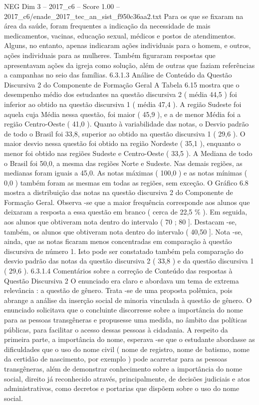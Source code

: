 \begin{textsample}{NEG Dim 3 – 2017\_c6 – Score 1.00 – 2017\_c6/enade\_2017\_tec\_an\_sist\_f950c36aa2.txt}
Para os que se fixaram na área da saúde, foram frequentes a indicação da necessidade de mais medicamentos, vacinas, educação sexual, médicos e postos de atendimentos.
Alguns, no entanto, apenas indicaram ações individuais para o homem, e outros, ações individuais para as mulheres.
Também figuraram respostas que apresentavam ações da igreja como solução, além de outras que faziam referências a campanhas no seio das famílias. 6.3.1.3 Análise de Conteúdo da Questão Discursiva 2 do Componente de Formação Geral A Tabela 6.15 mostra que o desempenho médio dos estudantes na questão discursiva 2 ( média 44,5 ) foi inferior ao obtido na questão discursiva 1 ( média 47,4 ).
A região Sudeste foi aquela cuja Média nessa questão, foi maior ( 45,9 ), e a de menor Média foi a região Centro-Oeste ( 41,0 ).
Quanto à variabilidade das notas, o Desvio padrão de todo o Brasil foi 33,8, superior ao obtido na questão discursiva 1 ( 29,6 ).
O maior desvio nessa questão foi obtido na região Nordeste ( 35,1 ), enquanto o menor foi obtido nas regiões Sudeste e Centro-Oeste ( 33,5 ).
A Mediana de todo o Brasil foi 50,0, a mesma das regiões Norte e Sudeste.
Nas demais regiões, as medianas foram iguais a 45,0.
As notas máximas ( 100,0 ) e as notas mínimas ( 0,0 ) também foram as mesmas em todas as regiões, sem exceção.
O Gráfico 6.8 mostra a distribuição das notas na questão discursiva 2 do Componente de Formação Geral.
Observa -se que a maior frequência corresponde aos alunos que deixaram a resposta a essa questão em branco ( cerca de 22,5 \% ).
Em seguida, aos alunos que obtiveram nota dentro do intervalo ( 70 ; 80 ].
Destacam -se, também, os alunos que obtiveram nota dentro do intervalo ( 40,50 ].
Nota -se, ainda, que as notas ficaram menos concentradas em comparação à questão discursiva de número 1.
Isto pode ser constatado também pela comparação do desvio padrão das notas da questão discursiva 2 ( 33,8 ) e da questão discursiva 1 ( 29,6 ). 6.3.1.4 Comentários sobre a correção de Conteúdo das respostas à Questão Discursiva 2 O enunciado era claro e abordava um tema de extrema relevância : a questão de gênero.
Trata -se de uma proposta polêmica, pois abrange a análise da inserção social de minoria vinculada à questão de gênero.
O enunciado solicitava que o concluinte discorresse sobre a importância do nome para as pessoas transgêneras e propusesse uma medida, no âmbito das políticas públicas, para facilitar o acesso dessas pessoas à cidadania.
A respeito da primeira parte, a importância do nome, esperava -se que o estudante abordasse as dificuldades que o uso do nome civil ( nome de registro, nome de batismo, nome da certidão de nascimento, por exemplo ) pode acarretar para as pessoas transgêneras, além de demonstrar conhecimento sobre a importância do nome social, direito já reconhecido através, principalmente, de decisões judiciais e atos administrativos, como decretos e portarias que dispõem sobre o uso do nome social.

\end{textsample}
